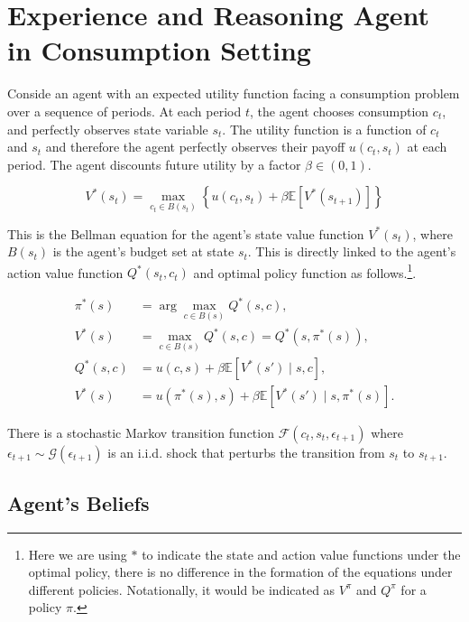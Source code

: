 \section{Experience and Reasoning Agent in Consumption Setting} \label{app:experience_reasoning_agent_consumption}

Conside an agent with an expected utility function facing a consumption problem
over a sequence of periods. At each period $t$, the agent chooses consumption $c_t$,
and perfectly observes state variable $s_t$. The utility function is a function of
$c_t$ and $s_t$ and therefore the agent perfectly observes their payoff $u(c_t, s_t)$ at
each period. The agent discounts future utility by a factor $\beta \in (0,1)$.

\begin{equation}
    V^*(s_t) = \max_{c_t \in B(s_t)} \left\{ u(c_t, s_t) + \beta \mathbb{E} \left[ V^*(s_{t+1}) \right] \right\}
\end{equation}

This is the Bellman equation for the agent's state value function $V^*(s_t)$, where
$B(s_t)$ is the agent's budget set at state $s_t$. This is directly linked to the
agent's action value function $Q^*(s_t, c_t)$ and optimal policy function as follows.\footnote{Here we are using 
$*$ to indicate the state and action value functions under the optimal policy,
there is no difference in the formation of the equations under different policies. 
Notationally, it would be indicated as $V^\pi$ and $Q^\pi$ for a policy $\pi$.}.

\begin{align*}
    \pi^*(s) &= \arg\max_{c \in B(s)} Q^*(s, c), \\
    V^*(s) &= \max_{c \in B(s)} Q^*(s, c) = Q^*(s, \pi^*(s)), \\
    Q^*(s, c) &= u(c, s) + \beta \mathbb{E}[V^*(s') \mid s, c], \\
    V^*(s) &= u(\pi^*(s), s) + \beta \mathbb{E}[V^*(s') \mid s, \pi^*(s)].
\end{align*}

There is a stochastic Markov transition function $\mathcal{F}(c_t, s_t, \epsilon_{t+1})$
where $\epsilon_{t+1} \sim \mathcal{G}(\epsilon_{t+1})$ is an i.i.d. shock that perturbs
the transition from $s_t$ to $s_{t+1}$.

\subsection{Agent's Beliefs} \label{subsec:agent_beliefs}

